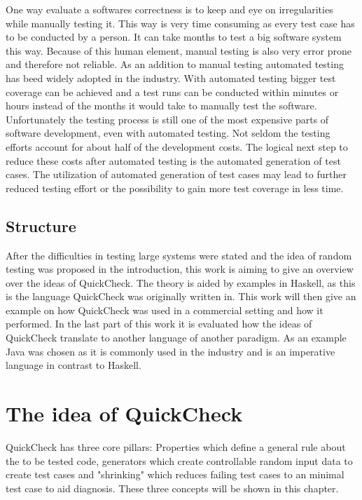 \documentclass[a4paper, 12pt]{article} %
\begin{document}
One way evaluate a softwares correctness is to keep and eye on irregularities while manually testing it. This way is very time consuming as every test case has to be conducted by a person. It can take months to test a big software system this way. \cite{Arts06} Because of this human element, manual testing is also very error prone and therefore not reliable. As an addition to manual testing automated testing has beed widely adopted in the industry. With automated testing bigger test coverage can be achieved and a test runs can be conducted within minutes or hours instead of the months it would take to manually test the software. Unfortunately the testing process is still one of the most expensive parts of software development, even with automated testing. Not seldom the testing efforts account for about half of the development costs. \cite{Claessen2000} The logical next step to reduce these costs after automated testing is the automated generation of test cases. The utilization of automated generation of test cases may lead to further reduced testing effort or the possibility to gain more test coverage in less time.

\subsection{Structure}

After the difficulties in testing large systems were stated and the idea of random testing was proposed in the introduction, this work is aiming to give an overview over the ideas of QuickCheck. The theory is aided by examples in Haskell, as this is the language QuickCheck was originally written in. This work will then give an example on how QuickCheck was used in a commercial setting and how it performed. In the last part of this work it is evaluated how the ideas of QuickCheck translate to another language of another paradigm. As an example Java was chosen as it is commonly used in the industry and is an imperative language in contrast to Haskell.

\section{The idea of QuickCheck}

QuickCheck has three core pillars: Properties which define a general rule about the to be tested code, generators which create controllable random input data to create test cases and "shrinking" which reduces failing test cases to an minimal test case to aid diagnosis. These three concepts will be shown in this chapter.
\end{document}
